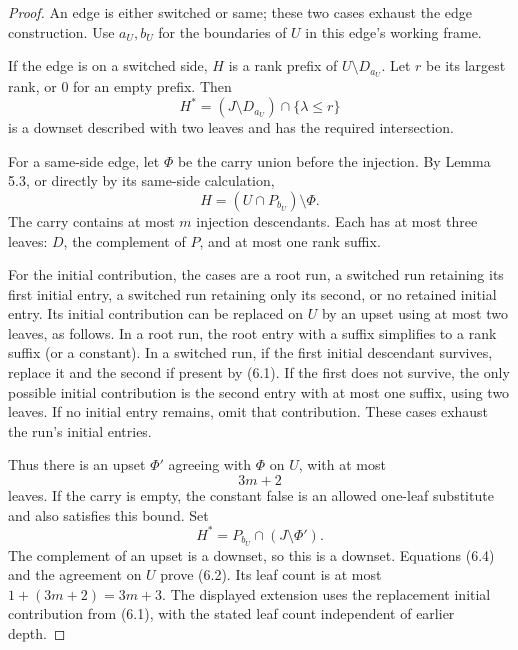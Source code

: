\begin{proof}
An edge is either switched or same; these two cases exhaust the edge construction. Use \(a_U,b_U\) for the boundaries of \(U\) in this edge's working frame.

If the edge is on a switched side, \(H\) is a rank prefix of \(U\setminus D_{a_U}\). Let \(r\) be its largest rank, or \(0\) for an empty prefix. Then \[
H^*=(J\setminus D_{a_U})\cap\{\lambda\leq r\}
\tag{6.3}
\] is a downset described with two leaves and has the required intersection.

For a same-side edge, let \(\Phi\) be the carry union before the injection. By Lemma 5.3, or directly by its same-side calculation, \[
H=(U\cap P_{b_U})\setminus\Phi.
\tag{6.4}
\] The carry contains at most \(m\) injection descendants. Each has at most three leaves: \(D\), the complement of \(P\), and at most one rank suffix.

For the initial contribution, the cases are a root run, a switched run retaining its first initial entry, a switched run retaining only its second, or no retained initial entry. Its initial contribution can be replaced on \(U\) by an upset using at most two leaves, as follows. In a root run, the root entry with a suffix simplifies to a rank suffix (or a constant). In a switched run, if the first initial descendant survives, replace it and the second if present by (6.1). If the first does not survive, the only possible initial contribution is the second entry with at most one suffix, using two leaves. If no initial entry remains, omit that contribution. These cases exhaust the run's initial entries.

Thus there is an upset \(\Phi'\) agreeing with \(\Phi\) on \(U\), with at most \[
3m+2
\tag{6.5}
\] leaves. If the carry is empty, the constant false is an allowed one-leaf substitute and also satisfies this bound. Set \[
H^*=P_{b_U}\cap(J\setminus\Phi').
\tag{6.6}
\] The complement of an upset is a downset, so this is a downset. Equations (6.4) and the agreement on \(U\) prove (6.2). Its leaf count is at most \(1+(3m+2)=3m+3\). The displayed extension uses the replacement initial contribution from (6.1), with the stated leaf count independent of earlier depth.
\end{proof}

